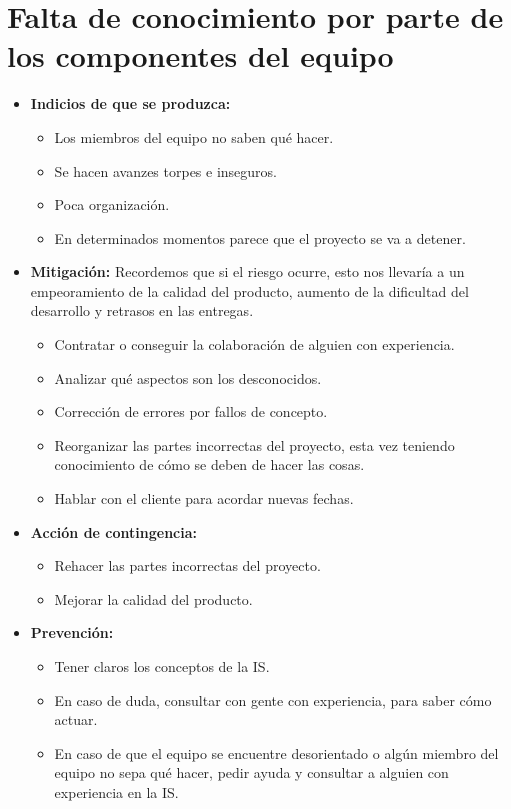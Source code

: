 \documentclass[spanish,a4paper,12pt]{report}	%
\begin{document}
	\section{Falta de conocimiento por parte de los componentes del equipo}
		\begin{itemize}
			\item \textbf {Indicios de que se produzca: }%
				\begin{itemize}
					\item Los miembros del equipo no saben qué hacer.
					\item Se hacen avanzes torpes e inseguros.
					\item Poca organización. 
					\item En determinados momentos parece que el proyecto se va a detener.
				\end{itemize}
			\item \textbf {Mitigación: }Recordemos que si el riesgo ocurre, esto nos llevaría a un empeoramiento de la calidad
										del producto, aumento de la dificultad del desarrollo y retrasos en las entregas.
				\begin{itemize}
				  \item Contratar o conseguir la colaboración de alguien con experiencia.
				  \item Analizar qué aspectos son los desconocidos. 
				  \item Corrección de errores por fallos de concepto.
				  \item Reorganizar las partes incorrectas del proyecto, esta vez teniendo conocimiento de cómo se deben
				  		de hacer las cosas.
				  \item Hablar con el cliente para acordar nuevas fechas. 
				\end{itemize} 
			\item \textbf {Acción de contingencia: }
				\begin{itemize}
				  \item Rehacer las partes incorrectas del proyecto.
				  \item Mejorar la calidad del producto.
				\end{itemize}
			\item \textbf {Prevención: }%
				\begin{itemize}
					\item Tener claros los conceptos de la IS.
					\item En caso de duda, consultar con gente
						con experiencia, para saber cómo actuar.
					\item En caso de que el equipo se encuentre desorientado o algún miembro del equipo no sepa qué hacer,
							pedir ayuda y consultar a alguien con experiencia en la IS. 
				\end{itemize} 
			\end{itemize}
	
\end{document}
